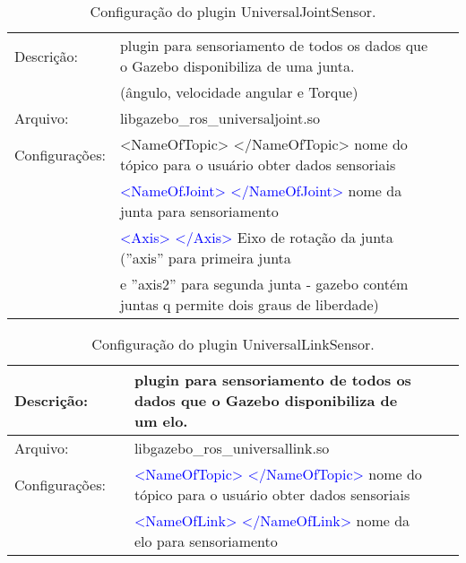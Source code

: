 			\begin{table}[h]
			\centering
			\begin{tabular}{|r|lr|}
			\hline
			\multicolumn{1}{|l|}{Descrição: } & plugin para sensoriamento de todos os dados que o Gazebo disponibiliza de uma junta. &         \\
			&  (ângulo, velocidade angular e Torque) &        \\
			\hline
			\multicolumn{1}{|l|}{Arquivo: } & libgazebo\_ros\_universaljoint.so &    \\
			\hline
			\multicolumn{1}{|l|}{Configurações:} & <NameOfTopic> </NameOfTopic> nome do tópico para o usuário obter dados sensoriais &      \\
			& \textcolor{blue}{<NameOfJoint> </NameOfJoint>} nome da junta para sensoriamento &     \\
			& \textcolor{blue}{<Axis> </Axis>} Eixo de rotação da junta (''axis'' para primeira junta  &    \\
			& e ''axis2'' para segunda junta - gazebo contém juntas q permite dois graus de liberdade) &     \\
			\hline
			\end{tabular}%
			\caption{Configuração do plugin UniversalJointSensor.}
			\label{tab:UniversalJointSensor}%
			\end{table}%
				\begin{table}[h]
				\centering
				\begin{tabular}{|rr|lrr|}
				\hline
				\multicolumn{1}{|l}{Descrição: } &       & plugin para sensoriamento de todos os dados que o Gazebo disponibiliza de um elo. &       &     \\
				\hline
				\multicolumn{1}{|l}{Arquivo: } &       & libgazebo\_ros\_universallink.so &       &         \\
				\hline
				\multicolumn{1}{|l}{Configurações: } &       & \textcolor{blue}{<NameOfTopic> </NameOfTopic>} nome do tópico para o usuário obter dados sensoriais &           &  \\
				&       & \textcolor{blue}{<NameOfLink> </NameOfLink>} nome da elo para sensoriamento &        &  \\
				\hline
				\end{tabular}%
				\caption{Configuração do plugin UniversalLinkSensor.}
				\label{tab:UniversalLinkSensor}%
				\end{table}%
